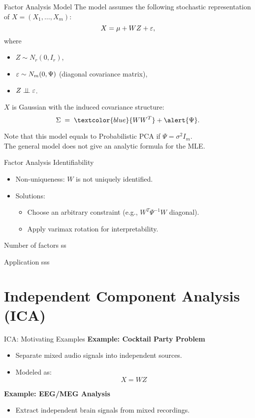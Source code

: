 \documentclass[11pt,handout,aspectratio=169]{beamer}
\begin{document}
\begin{frame}{Factor Analysis Model}
The model assumes the following stochastic representation of $X=(X_1,\ldots,X_m)$:
\[ X = \mu + WZ + \varepsilon, \]
where
        \begin{itemize}
            \item $Z \sim N_r(0, I_r)$,
            \item $\varepsilon \sim N_m(0, \Psi)$ (diagonal covariance matrix),
            \item $Z\perp\!\!\! \perp \varepsilon$.
        \end{itemize}
$X$ is Gaussian with the induced covariance structure: \[ \Sigma \;=\; \textcolor{blue}{WW^T} + \alert{\Psi}. \]
\begin{alertblock}{}
	Note that this model equals to Probabilistic PCA if $\Psi=\sigma^2I_m$.\\[4mm]
	The general model does not give an analytic formula for the MLE. 
\end{alertblock}

\end{frame}

\begin{frame}{Factor Analysis Identifiability}
    \begin{itemize}
        \item Non-uniqueness: $W$ is not uniquely identified.
        \item Solutions:
        \begin{itemize}
            \item Choose an arbitrary constraint (e.g., $W^T\Psi^{-1}W$ diagonal).
            \item Apply varimax rotation for interpretability.
        \end{itemize}
    \end{itemize}
\end{frame}

\begin{frame}{Number of factors}
	ss
\end{frame}

\begin{frame}{Application}
	sss
\end{frame}

\section{Independent Component Analysis (ICA)}

\begin{frame}{ICA: Motivating Examples}
    \textbf{Example: Cocktail Party Problem}
    \begin{itemize}
        \item Separate mixed audio signals into independent sources.
        \item Modeled as: \[ X = WZ \]
    \end{itemize}
    \textbf{Example: EEG/MEG Analysis}
    \begin{itemize}
        \item Extract independent brain signals from mixed recordings.
    \end{itemize}
\end{frame}
\end{document}
